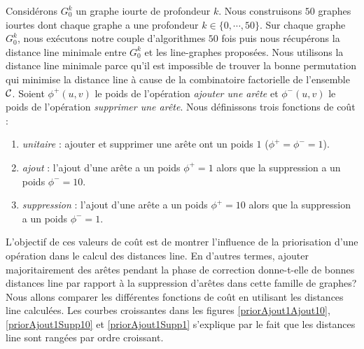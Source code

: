 Consid\'erons $G_0^k$ un graphe iourte de profondeur $k$.
Nous construisons $50$ graphes iourtes dont chaque graphe a une profondeur $k \in \{0,\cdots,50\}$.
Sur chaque graphe $G_0^k$, nous ex\'ecutons  notre couple d'algorithmes $50$ fois puis nous r\'ecup\'erons la distance line  minimale entre $G_0^k$ et les line-graphes propos\'ees.
Nous utilisons la   distance line  minimale parce qu'il est impossible de trouver la bonne permutation qui minimise la distance line \`a cause de la combinatoire factorielle de l'ensemble $\cal C$.
\newline
Soient $\phi^{+}(u,v)$ le poids de l'op\'eration {\em ajouter une ar\^ete} et $\phi^{-}(u,v)$ le poids de l'op\'eration {\em supprimer une ar\^ete}. 
Nous d\'efinissons trois fonctions de co\^ut :
\begin{enumerate}[label = (\alph*)]
\item {\em unitaire} : ajouter et supprimer une ar\^ete ont un poids $1$ ($\phi^{+} = \phi^{-} = 1$).
\item {\em ajout} : l'ajout d'une ar\^ete a un poids $\phi^{+} = 1$ alors que la suppression a un poids $\phi^{-} = 10$.
\item {\em suppression} : l'ajout d'une ar\^ete a un poids $\phi^{+} = 10$ alors que la suppression a un poids $\phi^{-} = 1$.
\end{enumerate}
L'objectif de ces valeurs de co\^ut  est de montrer l'influence de la priorisation d'une op\'eration dans le calcul des distances line. En d'autres termes, ajouter majoritairement des ar\^etes pendant la phase de correction donne-t-elle de bonnes distances line par rapport \`a la suppression  d'ar\^etes dans cette famille de graphes? 
\newline
Nous allons comparer les diff\'erentes fonctions de co\^ut en utilisant les distances line calcul\'ees. Les courbes croissantes dans les figures \ref{priorAjout1Ajout10}, \ref{priorAjout1Supp10} et \ref{priorAjout1Supp1} s'explique par le fait que les distances line sont rang\'ees par ordre croissant.